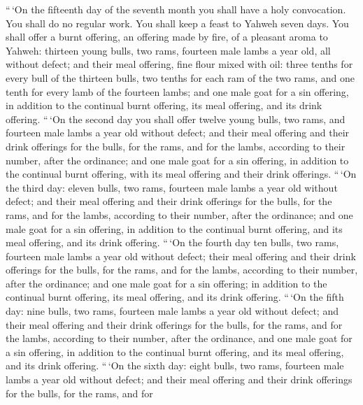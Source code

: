  ``\,`On the fifteenth day of the seventh month you shall
have a holy convocation. You shall do no regular work. You shall keep a
feast to Yahweh seven days.  You shall offer a burnt
offering, an offering made by fire, of a pleasant aroma to Yahweh:
thirteen young bulls, two rams, fourteen male lambs a year old, all
without defect;  and their meal offering, fine flour
mixed with oil: three tenths for every bull of the thirteen bulls, two
tenths for each ram of the two rams,  and one tenth for
every lamb of the fourteen lambs;  and one male goat for
a sin offering, in addition to the continual burnt offering, its meal
offering, and its drink offering.  ``\,`On the second day
you shall offer twelve young bulls, two rams, and fourteen male lambs a
year old without defect;  and their meal offering and
their drink offerings for the bulls, for the rams, and for the lambs,
according to their number, after the ordinance;  and one
male goat for a sin offering, in addition to the continual burnt
offering, with its meal offering and their drink offerings.
 ``\,`On the third day: eleven bulls, two rams, fourteen
male lambs a year old without defect;  and their meal
offering and their drink offerings for the bulls, for the rams, and for
the lambs, according to their number, after the ordinance;
 and one male goat for a sin offering, in addition to the
continual burnt offering, and its meal offering, and its drink offering.
 ``\,`On the fourth day ten bulls, two rams, fourteen
male lambs a year old without defect;  their meal
offering and their drink offerings for the bulls, for the rams, and for
the lambs, according to their number, after the ordinance;
 and one male goat for a sin offering; in addition to the
continual burnt offering, its meal offering, and its drink offering.
 ``\,`On the fifth day: nine bulls, two rams, fourteen
male lambs a year old without defect;  and their meal
offering and their drink offerings for the bulls, for the rams, and for
the lambs, according to their number, after the ordinance,
 and one male goat for a sin offering, in addition to the
continual burnt offering, and its meal offering, and its drink offering.
 ``\,`On the sixth day: eight bulls, two rams, fourteen
male lambs a year old without defect;  and their meal
offering and their drink offerings for the bulls, for the rams, and for
